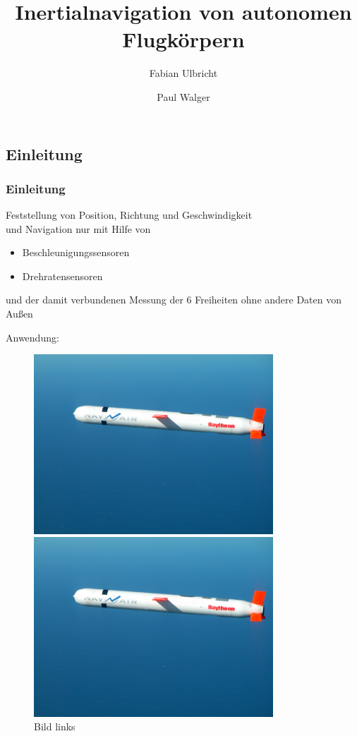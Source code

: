\documentclass[10pt,a4paper,oneside]{beamer}
\title{Inertialnavigation von autonomen Flugkörpern}
\author{
	Fabian Ulbricht \and
	Paul Walger 
}
\begin{document}
\frame{
	\titlepage
}


\begin{frame}
  \section{Einleitung}
  \frametitle{Einleitung}
  \begin{definition}[Inertialnavigation]
  Feststellung von Position, Richtung und Geschwindigkeit\\
  und Navigation nur mit Hilfe von
  \begin{itemize}
  \item Beschleunigungssensoren
  \item Drehratensensoren
  \end{itemize}
  und der damit verbundenen Messung der 6 Freiheiten ohne andere Daten von Außen
  \end{definition}
  Anwendung:
  \begin{figure}[htbp]
      \begin{minipage}{0.3\textwidth}
       \centering
        \includegraphics[width=0.8\textwidth]{images/cruise_missle.jpg}
        \caption{Bild links}
      \end{minipage}\hfill
      \begin{minipage}{0.3\textwidth}
       \centering
        \includegraphics[width=0.8\textwidth]{images/cruise_missle.jpg}

\end{minipage}
\end{figure}
\end{frame}
\end{document}
